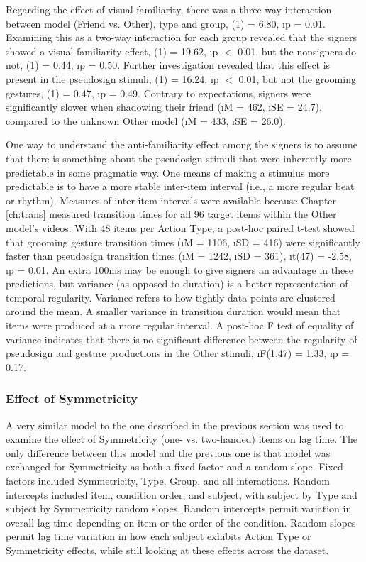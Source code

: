             Regarding the effect of visual familiarity, there was a three-way interaction between model (Friend vs. Other), type and group, \chsq(1) = 6.80, \i{p} = 0.01. Examining this as a two-way interaction for each group revealed that the signers showed a visual familiarity effect, \chsq(1) = 19.62, \i{p} $<$ 0.01, but the nonsigners do not, \chsq(1) = 0.44, \i{p} = 0.50. Further investigation revealed that this effect is present in the pseudosign stimuli, \chsq(1) = 16.24, \i{p} $<$ 0.01, but not the grooming gestures, \chsq(1) = 0.47, \i{p} = 0.49. Contrary to expectations, signers were significantly slower when shadowing their friend (\i{M} = 462, \i{SE} = 24.7), compared to the unknown Other model (\i{M} = 433, \i{SE} = 26.0).\par
            One way to understand the anti-familiarity effect among the signers is to assume that there is something about the pseudosign stimuli that were inherently more predictable in some pragmatic way. One means of making a stimulus more predictable is to have a more stable inter-item interval (i.e., a more regular beat or rhythm). Measures of inter-item intervals were available because Chapter \ref{ch:trans} measured transition times for all 96 target items within the Other model’s videos. With 48 items per Action Type, a post-hoc paired t-test showed that grooming gesture transition times (\i{M} = 1106, \i{SD} = 416) were significantly faster than pseudosign transition times (\i{M} = 1242, \i{SD} = 361), \i{t}(47) = -2.58, \i{p} = 0.01. An extra 100ms may be enough to give signers an advantage in these predictions, but variance (as opposed to duration) is a better representation of temporal regularity. Variance refers to how tightly data points are clustered around the mean. A smaller variance in transition duration would mean that items were produced at a more regular interval. A post-hoc F test of equality of variance indicates that there is no significant difference between the regularity of pseudosign and gesture productions in the Other stimuli, \i{F}(1,47) = 1.33, \i{p} = 0.17. \par
        \subsubsection{Effect of Symmetricity}
            A very similar model to the one described in the previous section was used to examine the effect of Symmetricity (one- vs. two-handed) items on lag time. The only difference between this model and the previous one is that model was exchanged for Symmetricity as both a fixed factor and a random slope. Fixed factors included Symmetricity, Type, Group, and all interactions. Random intercepts included item, condition order, and subject, with subject by Type and subject by Symmetricity random slopes. Random intercepts permit variation in overall lag time depending on item or the order of the condition. Random slopes permit lag time variation in how each subject exhibits Action Type or Symmetricity effects, while still looking at these effects across the dataset. \par
            
